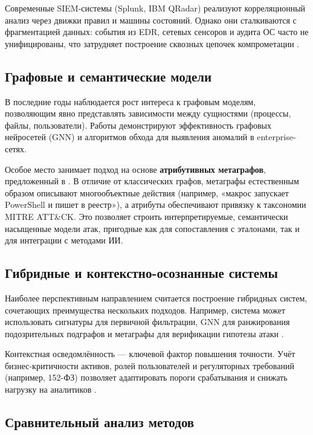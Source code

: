 \documentclass{article}
\begin{document}
Современные SIEM-системы (Splunk, IBM QRadar) реализуют корреляционный анализ через движки правил и машины состояний. Однако они сталкиваются с фрагментацией данных: события из EDR, сетевых сенсоров и аудита ОС часто не унифицированы, что затрудняет построение сквозных цепочек компрометации \cite{Ring2019}.

\subsection{Графовые и семантические модели}

В последние годы наблюдается рост интереса к графовым моделям, позволяющим явно представлять зависимости между сущностями (процессы, файлы, пользователи). Работы \cite{Raghavan2022, arXiv2023} демонстрируют эффективность графовых нейросетей (GNN) и алгоритмов обхода для выявления аномалий в enterprise-сетях.

Особое место занимает подход на основе \textbf{атрибутивных метаграфов}, предложенный в \cite{Latypov2020}. В отличие от классических графов, метаграфы естественным образом описывают многообъектные действия (например, «макрос запускает PowerShell и пишет в реестр»), а атрибуты обеспечивают привязку к таксономии MITRE ATT\&CK. Это позволяет строить интерпретируемые, семантически насыщенные модели атак, пригодные как для сопоставления с эталонами, так и для интеграции с методами ИИ.

\subsection{Гибридные и контекстно-осознанные системы}

Наиболее перспективным направлением считается построение гибридных систем, сочетающих преимущества нескольких подходов. Например, система может использовать сигнатуры для первичной фильтрации, GNN для ранжирования подозрительных подграфов и метаграфы для верификации гипотезы атаки \cite{Alazab2016}.

Контекстная осведомлённость — ключевой фактор повышения точности. Учёт бизнес-критичности активов, ролей пользователей и регуляторных требований (например, 152-ФЗ) позволяет адаптировать пороги срабатывания и снижать нагрузку на аналитиков \cite{FSTEK2015, eccu2024}.

\subsection{Сравнительный анализ методов}
\end{document}
